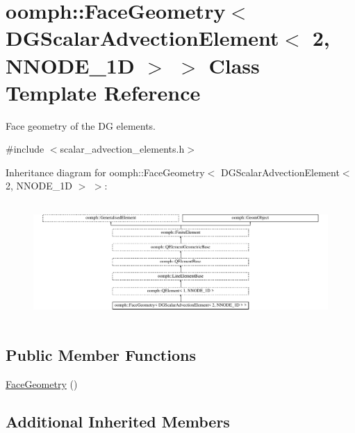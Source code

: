 \hypertarget{classoomph_1_1FaceGeometry_3_01DGScalarAdvectionElement_3_012_00_01NNODE__1D_01_4_01_4}{}\section{oomph\+:\+:Face\+Geometry$<$ D\+G\+Scalar\+Advection\+Element$<$ 2, N\+N\+O\+D\+E\+\_\+1D $>$ $>$ Class Template Reference}
\label{classoomph_1_1FaceGeometry_3_01DGScalarAdvectionElement_3_012_00_01NNODE__1D_01_4_01_4}


Face geometry of the DG elements.  




{\ttfamily \#include $<$scalar\+\_\+advection\+\_\+elements.\+h$>$}

Inheritance diagram for oomph\+:\+:Face\+Geometry$<$ D\+G\+Scalar\+Advection\+Element$<$ 2, N\+N\+O\+D\+E\+\_\+1D $>$ $>$\+:\begin{figure}[H]
\begin{center}
\leavevmode
\includegraphics[height=4.516129cm]{classoomph_1_1FaceGeometry_3_01DGScalarAdvectionElement_3_012_00_01NNODE__1D_01_4_01_4}
\end{center}
\end{figure}
\subsection*{Public Member Functions}
\begin{DoxyCompactItemize}
\item 
\hyperlink{classoomph_1_1FaceGeometry_3_01DGScalarAdvectionElement_3_012_00_01NNODE__1D_01_4_01_4_aad0e4588171ce6434d31cf9481d2aa22}{Face\+Geometry} ()
\end{DoxyCompactItemize}
\subsection*{Additional Inherited Members}


